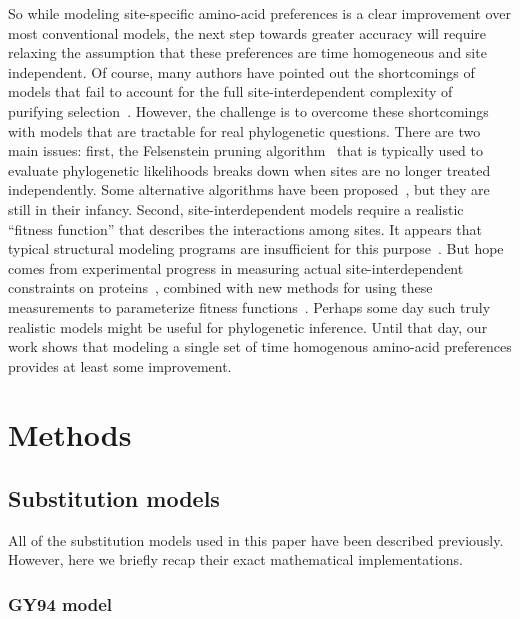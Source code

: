 \documentclass[11pt]{article}
\begin{document}
So while modeling site-specific amino-acid preferences is a clear improvement over most conventional models, the next step towards greater accuracy will require relaxing the assumption that these preferences are time homogeneous and site independent.
Of course, many authors have pointed out the shortcomings of models that fail to account for the full site-interdependent complexity of purifying selection~\citep{rodrigue2005site, choi2007quantifying, pollock2012amino, goldstein2017sequence}.
However, the challenge is to overcome these shortcomings with models that are tractable for real phylogenetic questions.
There are two main issues: first, the Felsenstein pruning algorithm~\citep{felsenstein1981evolutionary} that is typically used to evaluate phylogenetic likelihoods breaks down when sites are no longer treated independently.
Some alternative algorithms have been proposed~\citep{bordner2013new,rodrigue2009computational,rodrigue2005site, choi2007quantifying}, but they are still in their infancy.
Second, site-interdependent models require a realistic ``fitness function'' that describes the interactions among sites.
It appears that typical structural modeling programs are insufficient for this purpose~\citep{rodrigue2009computational}.
But hope comes from experimental progress in measuring actual site-interdependent constraints on proteins~\citep{olson2014comprehensive,wu2016adaptation,steinberg2016shifting,li2016fitness}, combined with new methods for using these measurements to parameterize fitness functions~\citep{sailer2017detecting,otwinowski2018inferring}.
Perhaps some day such truly realistic models might be useful for phylogenetic inference.
Until that day, our work shows that modeling a single set of time homogenous amino-acid preferences provides at least some improvement.

\clearpage
\section*{Methods}

\subsection*{Substitution models}
All of the substitution models used in this paper have been described previously.
However, here we briefly recap their exact mathematical implementations.

\subsubsection*{GY94 model}
\end{document}
